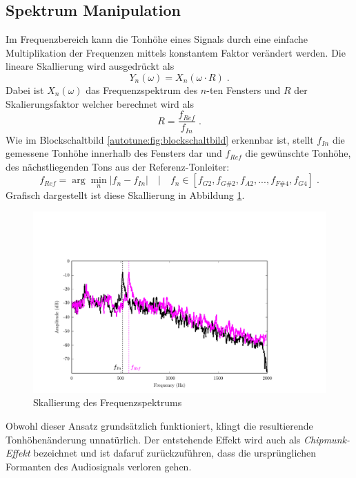 \subsection{Spektrum Manipulation
\label{autotune:subsection:spektrumManipulation}}
Im Frequenzbereich kann die Tonhöhe eines Signals durch eine einfache Multiplikation der Frequenzen mittels konstantem Faktor verändert werden.
Die lineare Skallierung wird ausgedrückt als
\begin{equation}
    Y_n(\omega)
    =
    X_n(\omega \cdot R) \;.
\end{equation}
Dabei ist $X_n(\omega)$ das Frequenzspektrum des $n$-ten Fensters und $R$ der Skalierungsfaktor welcher berechnet wird als
\begin{equation}
    R
    =
    \frac{f_{Ref}}{{f_{In}}} \;.
\end{equation}
Wie im Blockschaltbild \ref{autotune:fig:blockschaltbild} erkennbar ist,
stellt $f_{In}$ die gemessene Tonhöhe innerhalb des Fensters dar und $f_{Ref}$ die gewünschte Tonhöhe,
des nächstliegenden Tons aus der Referenz-Tonleiter:
\begin{equation}
    f_{Ref}
    =
    \arg\min_n \left| f_n - f_{In} \right|
    \quad | \quad
    f_n \in [f_{G2}, f_{G\#2}, f_{A2}, ..., f_{F\#4}, f_{G4}] \;.
\end{equation}
Grafisch dargestellt ist diese Skallierung in Abbildung \ref{autotune:fig:spektrumManipulation}.
\begin{figure}
    \centering
    \includegraphics[width=\textwidth]{papers/autotune/images/Spektrum-Manipulation.pdf}
    \caption{Skallierung des Frequenzspektrums}
    \label{autotune:fig:spektrumManipulation}
\end{figure}
Obwohl dieser Ansatz grundsätzlich funktioniert, klingt die resultierende Tonhöhenänderung unnatürlich.
Der entstehende Effekt wird auch als \textit{Chipmunk-Effekt} bezeichnet und ist dafaruf zurückzuführen,
dass die ursprünglichen Formanten des Audiosignals verloren gehen.


